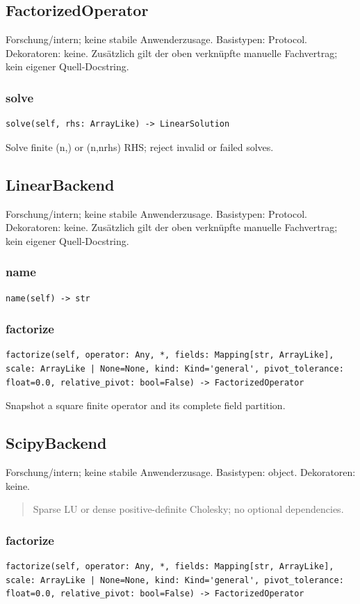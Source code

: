 \subsection{FactorizedOperator}
Forschung/intern; keine stabile Anwenderzusage.
Basistypen: Protocol. Dekoratoren: keine.
Zusätzlich gilt der oben verknüpfte manuelle Fachvertrag; kein eigener Quell-Docstring.
\subsubsection*{solve}
\begin{lstlisting}
solve(self, rhs: ArrayLike) -> LinearSolution
\end{lstlisting}
Solve finite (n,) or (n,nrhs) RHS; reject invalid or failed solves.
\subsection{LinearBackend}
Forschung/intern; keine stabile Anwenderzusage.
Basistypen: Protocol. Dekoratoren: keine.
Zusätzlich gilt der oben verknüpfte manuelle Fachvertrag; kein eigener Quell-Docstring.
\subsubsection*{name}
\begin{lstlisting}
name(self) -> str
\end{lstlisting}
\subsubsection*{factorize}
\begin{lstlisting}
factorize(self, operator: Any, *, fields: Mapping[str, ArrayLike], scale: ArrayLike | None=None, kind: Kind='general', pivot_tolerance: float=0.0, relative_pivot: bool=False) -> FactorizedOperator
\end{lstlisting}
Snapshot a square finite operator and its complete field partition.
\subsection{ScipyBackend}
Forschung/intern; keine stabile Anwenderzusage.
Basistypen: object. Dekoratoren: keine.
\begin{quote}
Sparse LU or dense positive-definite Cholesky; no optional dependencies.
\end{quote}
\subsubsection*{factorize}
\begin{lstlisting}
factorize(self, operator: Any, *, fields: Mapping[str, ArrayLike], scale: ArrayLike | None=None, kind: Kind='general', pivot_tolerance: float=0.0, relative_pivot: bool=False) -> FactorizedOperator
\end{lstlisting}
